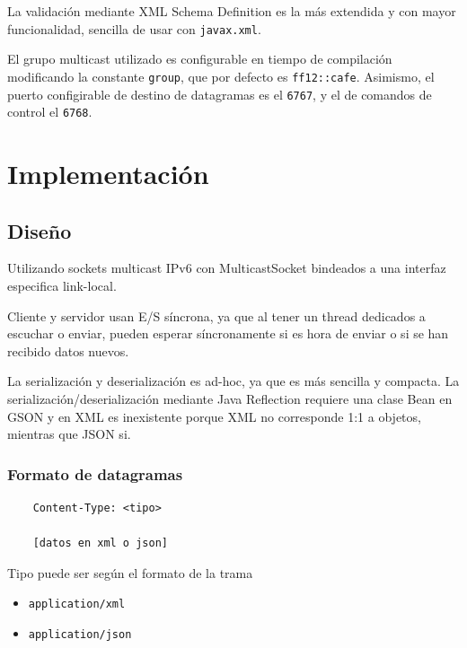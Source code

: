 \documentclass[12pt]{article}
\begin{document}
    La validación mediante XML Schema Definition es la más extendida y con mayor funcionalidad, sencilla de usar con \texttt{javax.xml}.

    El grupo multicast utilizado es configurable en tiempo de compilación modificando la constante \texttt{group}, que por defecto es \texttt{ff12::cafe}.
    Asimismo, el puerto configirable de destino de datagramas es el \texttt{6767}, y el de comandos de control el \texttt{6768}.

    \section{Implementación}
    
    \subsection{Diseño}

    Utilizando sockets multicast IPv6 con MulticastSocket bindeados a una interfaz especifica link-local.

    Cliente y servidor usan E/S síncrona, ya que al tener un thread dedicados a escuchar o enviar,
    pueden esperar síncronamente si es hora de enviar o si se han recibido datos nuevos.

    La serialización y deserialización es ad-hoc, ya que es más sencilla y compacta.
    La serialización/deserialización mediante Java Reflection requiere una clase Bean en GSON
    y en XML es inexistente porque XML no corresponde 1:1 a objetos, mientras que JSON si.

    \subsubsection{Formato de datagramas}

    \begin{verbatim}
    Content-Type: <tipo>

    [datos en xml o json]
    \end{verbatim}

    Tipo puede ser según el formato de la trama

    \begin{itemize}
    \item \texttt{application/xml}
    \item \texttt{application/json}
    \end{itemize}
\end{document}

